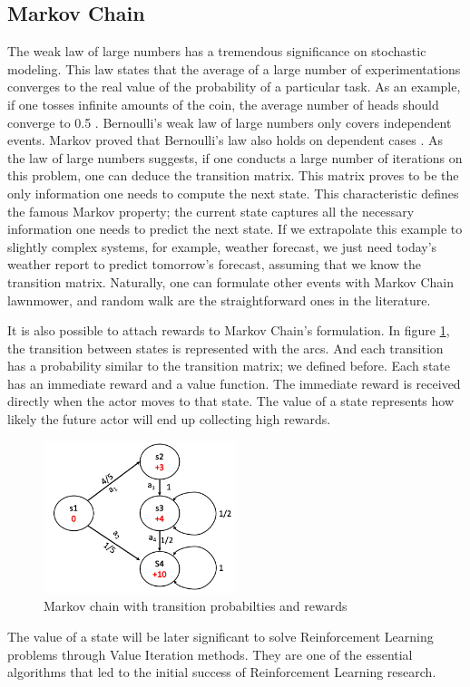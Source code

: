 \subsection{Markov Chain}

The weak law of large numbers has a tremendous significance on stochastic modeling. This law states that the average of a large number of experimentations converges to the real value of the probability of a particular task. As an example, if one tosses infinite amounts of the coin, the average number of heads should converge to 0.5 \cite{Gagniuc2017}. 
Bernoulli’s weak law of large numbers only covers independent events. Markov proved that Bernoulli’s law also holds on dependent cases \cite{Gagniuc2017}. 
As the law of large numbers suggests, if one conducts a large number of iterations on this problem, one can deduce the transition matrix. This matrix proves to be the only information one needs to compute the next state.
This characteristic defines the famous Markov property; the current state captures all the necessary information one needs to predict the next state. If we extrapolate this example to slightly complex systems, for example, weather forecast, we just need today’s weather report to predict tomorrow’s forecast, assuming that we know the transition matrix. Naturally, one can formulate other events with Markov Chain lawnmower, and random walk are the straightforward ones in the literature\cite{Gagniuc2017}.

It is also possible to attach rewards to Markov Chain’s formulation. In figure \ref{fig: markov_chain}, the transition between states is represented with the arcs. And each transition has a probability similar to the transition matrix; we defined before. Each state has an immediate reward and a value function. The immediate reward is received directly when the actor moves to that state. The value of a state represents how likely the future actor will end up collecting high rewards. 

\begin{figure}[htbp]
    \centering
    \includegraphics[width=0.5\textwidth]{figures/markovchain}
    \caption{Markov chain with transition probabilties and rewards}
    \label{fig: markov_chain}
\end{figure}

The value of a state will be later significant to solve Reinforcement Learning problems through Value Iteration methods. They are one of the essential algorithms that led to the initial success of Reinforcement Learning research.
